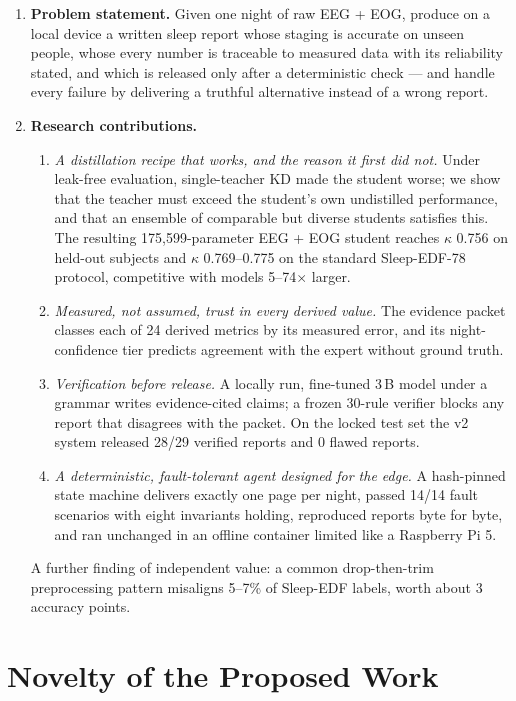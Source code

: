 \begin{enumerate}
  \item \textbf{Problem statement.} Given one night of raw EEG + EOG, produce on a local device a written sleep
  report whose staging is accurate on unseen people, whose every number is traceable to measured data with its
  reliability stated, and which is released only after a deterministic check --- and handle every failure by
  delivering a truthful alternative instead of a wrong report.
  \item \textbf{Research contributions.}
  \begin{enumerate}
    \item \emph{A distillation recipe that works, and the reason it first did not.} Under leak-free evaluation,
    single-teacher KD made the student worse; we show that the teacher must exceed the student's own undistilled
    performance, and that an ensemble of comparable but diverse students satisfies this. The resulting
    175,599-parameter EEG + EOG student reaches $\kappa$ 0.756 on held-out subjects and $\kappa$ 0.769--0.775 on the
    standard Sleep-EDF-78 protocol, competitive with models 5--74$\times$ larger.
    \item \emph{Measured, not assumed, trust in every derived value.} The evidence packet classes each of 24 derived
    metrics by its measured error, and its night-confidence tier predicts agreement with the expert without ground
    truth.
    \item \emph{Verification before release.} A locally run, fine-tuned 3\,B model under a grammar writes
    evidence-cited claims; a frozen 30-rule verifier blocks any report that disagrees with the packet. On the
    locked test set the v2 system released 28/29 verified reports and 0 flawed reports.
    \item \emph{A deterministic, fault-tolerant agent designed for the edge.} A hash-pinned state machine delivers
    exactly one page per night, passed 14/14 fault scenarios with eight invariants holding, reproduced reports byte
    for byte, and ran unchanged in an offline container limited like a Raspberry Pi 5.
  \end{enumerate}
  A further finding of independent value: a common drop-then-trim preprocessing pattern misaligns 5--7\% of
  Sleep-EDF labels, worth about 3 accuracy points.
\end{enumerate}

\section{Novelty of the Proposed Work}

